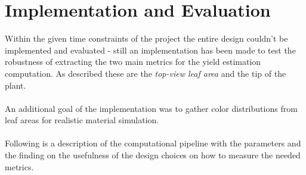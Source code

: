 \section{Implementation and Evaluation}

Within the given time constraints of the project the entire design couldn't be implemented and evaluated - still an implementation
has been made to test the robustness of extracting the two main metrics for the yield estimation computation.
As described these are the \textit{top-view leaf area} and the tip of the plant.
\\
\\
An additional goal of the implementation was to gather color distributions from leaf areas for realistic material simulation.
\\
\\
Following is a description of the computational pipeline with the parameters and the finding on the usefulness of the design choices
on how to measure the needed metrics.